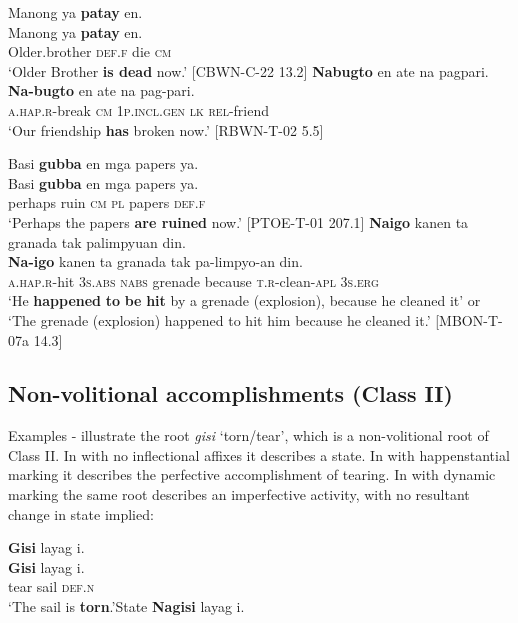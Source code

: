 \ea
Manong  ya  \textbf{patay}  en. \\\smallskip
\gll Manong  ya  \textbf{patay}  en. \\
Older.brother  \textsc{def.f}  die  \textsc{cm} \\
\glt ‘Older Brother \textbf{is dead} now.’ [CBWN-C-22 13.2]
\z
\ea
\textbf{Nabugto}  en  ate  na  pagpari. \\\smallskip
\gll \textbf{Na-bugto}  en  ate  na  pag-pari. \\
\textsc{a.hap.r}-break  \textsc{cm}  1\textsc{p.incl.gen}  \textsc{lk}  \textsc{rel}-friend \\
\glt ‘Our friendship \textbf{has} broken now.’ [RBWN-T-02 5.5]
\z

\newpage
\ea
Basi  \textbf{gubba}  en  mga  papers  ya. \\\smallskip
\gll Basi  \textbf{gubba}  en  mga  papers  ya. \\
perhaps  ruin  \textsc{cm}  \textsc{pl}  papers  \textsc{def.f} \\
\glt ‘Perhaps the papers \textbf{are ruined} now.’ [PTOE-T-01 207.1]
\z
\ea
\label{bkm:Ref119566298}
\textbf{Naigo}  kanen  ta  granada  tak  palimpyuan  din. \\\smallskip
\gll \textbf{Na-igo}  kanen  ta  granada  tak  pa-limpyo-an  din. \\
\textsc{a.hap.r}-hit  3\textsc{s.abs}  \textsc{nabs}  grenade  because  \textsc{t.r}-clean-\textsc{apl}  3\textsc{s.erg} \\
\glt ‘He \textbf{happened} \textbf{to} \textbf{be} \textbf{hit} by a grenade (explosion), because he cleaned it’ or ‘The grenade (explosion) happened to hit him because he cleaned it.’ [MBON-T-07a 14.3]
\z

\subsection{Non-volitional accomplishments (Class II)}

Examples - illustrate the root \textit{gisi} ‘torn/tear’, which is a non-volitional root of Class II. In  with no inflectional affixes it describes a state. In  with happenstantial marking it describes the perfective accomplishment of tearing. In  with dynamic marking the same root describes an imperfective activity, with no resultant change in state implied:

\ea
\label{bkm:Ref398301059}
\textbf{Gisi}  layag  i. \\\smallskip
\gll \textbf{Gisi}  layag  i. \\
tear  sail  \textsc{def.n} \\
\glt ‘The sail is \textbf{torn}.’\hspace{1cm}State
\z
\ea
\label{bkm:Ref367348391}
\textbf{Nagisi}  layag  i. \\\smallskip

